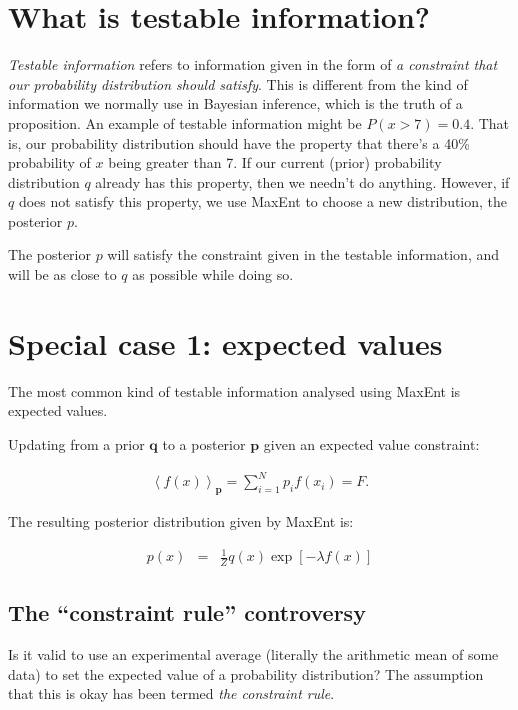 \documentclass[a4paper, 11pt]{article}
\begin{document}
\section{What is testable information?}
{\it Testable information} refers to information given in the form of
{\it a constraint that our probability distribution should satisfy}. This is
different from the kind of information we normally use in Bayesian inference,
which is the truth of a proposition. An example of testable information
might be $P(x > 7) = 0.4$. That is, our probability distribution should have
the property that there's a 40\% probability of $x$ being greater than 7.
If our current (prior) probability distribution $q$ already has this property,
then we needn't do anything. However, if $q$ does not satisfy this property,
we use MaxEnt to choose a new distribution, the posterior $p$.

The posterior $p$ will satisfy the constraint given in the testable information,
and will be as close to $q$ as possible while doing so.



\section{Special case 1: expected values}\label{sec:expectations}
The most common kind of testable information analysed using MaxEnt is
expected values. 

 Updating from a prior $\boldsymbol{q}$ to a posterior
$\boldsymbol{p}$ given an expected value constraint:

\begin{eqnarray}
\left<f(x)\right>_{\boldsymbol{p}} = \sum_{i=1}^N p_i f(x_i) = F.
\end{eqnarray}

The resulting posterior distribution given by MaxEnt is:

\begin{eqnarray}
p(x) &=& \frac{1}{Z}q(x)\exp\left[-\lambda f(x)\right] 
\end{eqnarray}


\subsection{The ``constraint rule'' controversy}
Is it valid to use an experimental average (literally the arithmetic mean of
some data) to set the expected value of a probability distribution? The
assumption that this is okay has been termed {\it the constraint rule}.
\end{document}
